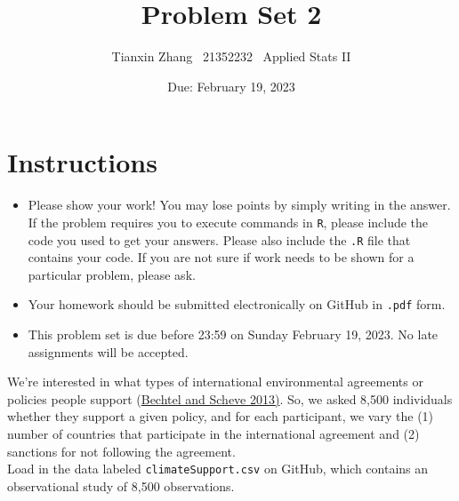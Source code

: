 \documentclass[12pt,letterpaper]{article}
\title{Problem Set 2}
\date{Due: February 19, 2023}
\author{Tianxin Zhang \ 21352232 \ Applied Stats II}
\begin{document}
	\maketitle
	\section*{Instructions}
	\begin{itemize}
		\item Please show your work! You may lose points by simply writing in the answer. If the problem requires you to execute commands in \texttt{R}, please include the code you used to get your answers. Please also include the \texttt{.R} file that contains your code. If you are not sure if work needs to be shown for a particular problem, please ask.
		\item Your homework should be submitted electronically on GitHub in \texttt{.pdf} form.
		\item This problem set is due before 23:59 on Sunday February 19, 2023. No late assignments will be accepted.
	\end{itemize}

	
	

	\vspace{.25cm}
\noindent We're interested in what types of international environmental agreements or policies people support (\href{https://www.pnas.org/content/110/34/13763}{Bechtel and Scheve 2013)}. So, we asked 8,500 individuals whether they support a given policy, and for each participant, we vary the (1) number of countries that participate in the international agreement and (2) sanctions for not following the agreement. \\

\noindent Load in the data labeled \texttt{climateSupport.csv} on GitHub, which contains an observational study of 8,500 observations.
\end{document}
